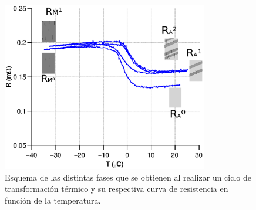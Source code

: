 \documentclass[a4paper,12pt,fleqn,twoside,openany]{book}
\begin{document}
 
 \begin{figure}[h]
 \centering
 \includegraphics[width=0.8\textwidth]{Img/Resultados/Resistencia/Histeresis2.eps}
 \caption{Esquema de las distintas fases que se obtienen al realizar un ciclo de transformación térmico y su respectiva curva de resistencia en función de la temperatura.} 
 \label{fig:HistEsquema}
 \end{figure}
% 
% 
% 
% 
% 
\end{document}
